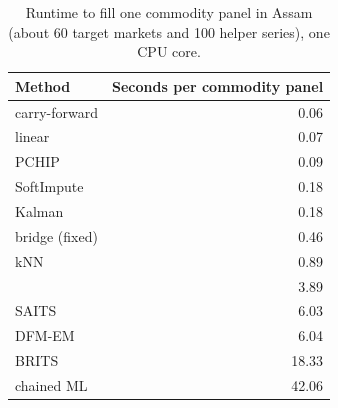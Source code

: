\begin{table}[tbp]
\caption{Runtime to fill one commodity panel in Assam (about 60 target markets and 100 helper series), one CPU core.}
\label{tab:runtime}
\small
\begin{tabular}{lr}
\toprule
Method & Seconds per commodity panel \\
\midrule
carry-forward & 0.06 \\
linear & 0.07 \\
PCHIP & 0.09 \\
SoftImpute & 0.18 \\
Kalman & 0.18 \\
bridge (fixed) & 0.46 \\
kNN & 0.89 \\
\auto{} & 3.89 \\
SAITS & 6.03 \\
DFM-EM & 6.04 \\
BRITS & 18.33 \\
chained ML & 42.06 \\
\bottomrule
\end{tabular}
\end{table}
